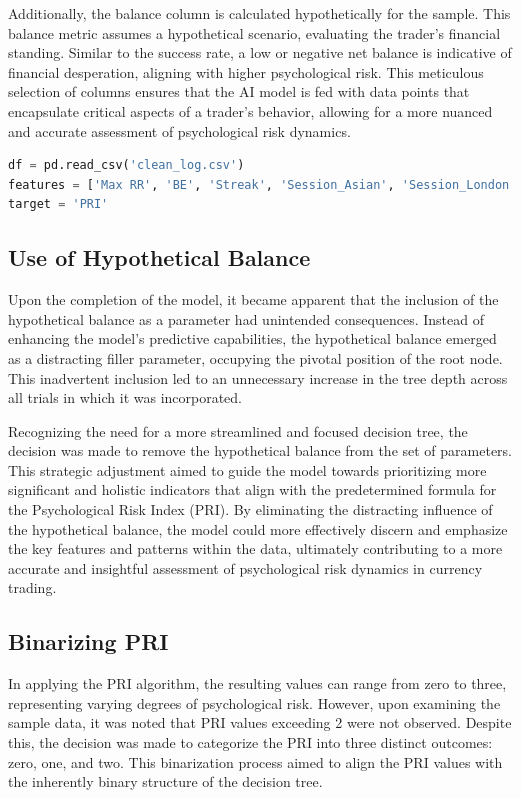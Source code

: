 \documentclass{article}
\begin{document}
Additionally, the balance column is calculated hypothetically for the sample. This balance metric assumes a hypothetical scenario, evaluating the trader's financial standing. Similar to the success rate, a low or negative net balance is indicative of financial desperation, aligning with higher psychological risk. This meticulous selection of columns ensures that the AI model is fed with data points that encapsulate critical aspects of a trader's behavior, allowing for a more nuanced and accurate assessment of psychological risk dynamics.

\begin{lstlisting}[language=Python, caption={Final Data Categories}, label={lst:python}]
df = pd.read_csv('clean_log.csv')
features = ['Max RR', 'BE', 'Streak', 'Session_Asian', 'Session_London']
target = 'PRI'
\end{lstlisting}

\subsection{Use of Hypothetical Balance}
Upon the completion of the model, it became apparent that the inclusion of the hypothetical balance as a parameter had unintended consequences. Instead of enhancing the model's predictive capabilities, the hypothetical balance emerged as a distracting filler parameter, occupying the pivotal position of the root node. This inadvertent inclusion led to an unnecessary increase in the tree depth across all trials in which it was incorporated.

Recognizing the need for a more streamlined and focused decision tree, the decision was made to remove the hypothetical balance from the set of parameters. This strategic adjustment aimed to guide the model towards prioritizing more significant and holistic indicators that align with the predetermined formula for the Psychological Risk Index (PRI). By eliminating the distracting influence of the hypothetical balance, the model could more effectively discern and emphasize the key features and patterns within the data, ultimately contributing to a more accurate and insightful assessment of psychological risk dynamics in currency trading.

\subsection{Binarizing PRI}
In applying the PRI algorithm, the resulting values can range from zero to three, representing varying degrees of psychological risk. However, upon examining the sample data, it was noted that PRI values exceeding 2 were not observed. Despite this, the decision was made to categorize the PRI into three distinct outcomes: zero, one, and two. This binarization process aimed to align the PRI values with the inherently binary structure of the decision tree.
\end{document}
